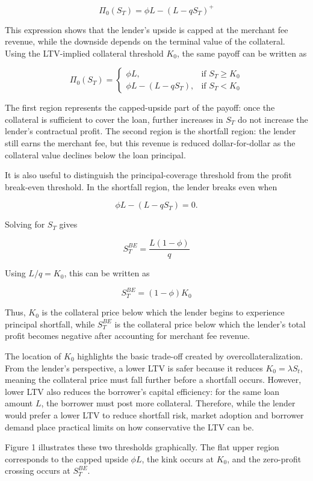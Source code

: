 \documentclass[11pt]{article}
\begin{document}
$$
\Pi_0(S_T) = \phi L - (L - qS_T)^+
$$

This expression shows that the lender’s upside is capped at the merchant fee revenue, while the downside depends on the terminal value of the collateral. Using the LTV-implied collateral threshold $K_0$, the same payoff can be written as

$$
\Pi_0(S_T) = 
\begin{cases}
\phi L, & \text{if } S_T\geq K_0  \\
\phi L - (L - qS_T), & \text{if } S_T < K_0
\end{cases}
$$

The first region represents the capped-upside part of the payoff: once the collateral is sufficient to cover the loan, further increases in $S_T$ do not increase the lender’s contractual profit. The second region is the shortfall region: the lender still earns the merchant fee, but this revenue is reduced dollar-for-dollar as the collateral value declines below the loan principal.

It is also useful to distinguish the principal-coverage threshold from the profit break-even threshold. In the shortfall region, the lender breaks even when

$$
\phi L - (L - qS_T) = 0.
$$

Solving for $S_T$ gives

$$
S_T^{BE} = \frac{L(1 - \phi)}{q}
$$

Using $L / q = K_0$, this can be written as

$$
S_T^{BE} = (1 - \phi) K_0
$$

Thus, $K_0$ is the collateral price below which the lender begins to experience principal shortfall, while $S_T^{BE}$ is the collateral price below which the lender’s total profit becomes negative after accounting for merchant fee revenue.

The location of $K_0$ highlights the basic trade-off created by overcollateralization. From the lender’s perspective, a lower LTV is safer because it reduces $K_0 = \lambda S_t$, meaning the collateral price must fall further before a shortfall occurs. However, lower LTV also reduces the borrower’s capital efficiency: for the same loan amount $L$, the borrower must post more collateral. Therefore, while the lender would prefer a lower LTV to reduce shortfall risk, market adoption and borrower demand place practical limits on how conservative the LTV can be.

Figure 1 illustrates these two thresholds graphically. The flat upper region corresponds to the capped upside $\phi L$, the kink occurs at $K_0$, and the zero-profit crossing occurs at $S_T^{BE}$.
\end{document}
